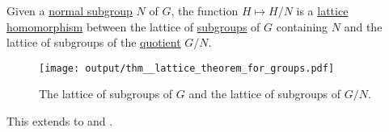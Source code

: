 \begin{theorem}\label{thm:quotient_subgroup_lattice_theorem}
  Given a \hyperref[thm:normal_subgroup_equivalences]{normal subgroup} \( N \) of \( G \), the function \( H \mapsto H / N \) is a \hyperref[def:semilattice/homomorphism]{lattice homomorphism} between the lattice of \hyperref[def:group/submodel]{subgroups} of \( G \) containing \( N \) and the lattice of subgroups of the \hyperref[def:group/quotient]{quotient} \( G / N \).

  \begin{figure}[h]
    \centering
    \texttt{[image: output/thm\_\_lattice\_theorem\_for\_groups.pdf]}
    \caption{The lattice of subgroups of \( G \) and the lattice of subgroups of \( G / N \).}
    \label{fig:thm:quotient_subgroup_lattice_theorem}
  \end{figure}

  This extends to  and .
\end{theorem}
